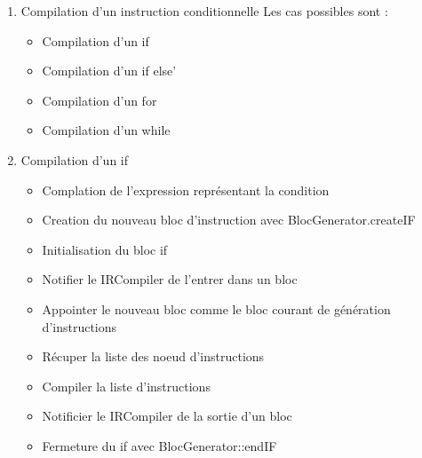 \documentclass{article}
\begin{document}
\begin{enumerate}
   \item Compilation d'un instruction conditionnelle
    Les cas possibles sont :
   \begin{itemize}
    \item Compilation d'un if
    \item Compilation d'un if else'
    \item Compilation d'un for
    \item Compilation d'un while
   \end{itemize}

   \item Compilation d'un if
     \begin{itemize}
       \item Complation de l'expression représentant la condition
       \item Creation du nouveau bloc d'instruction avec BlocGenerator.createIF
       \item Initialisation du bloc if     
       \item Notifier le IRCompiler de l'entrer dans un bloc
       \item Appointer le nouveau bloc comme le bloc courant de génération d'instructions
       \item Récuper la liste des noeud d'instructions
       \item Compiler la liste d'instructions
       \item Notificier le IRCompiler de la sortie d'un bloc
       \item Fermeture du if avec BlocGenerator::endIF
     \end{itemize}


\end{enumerate}
\end{document}
